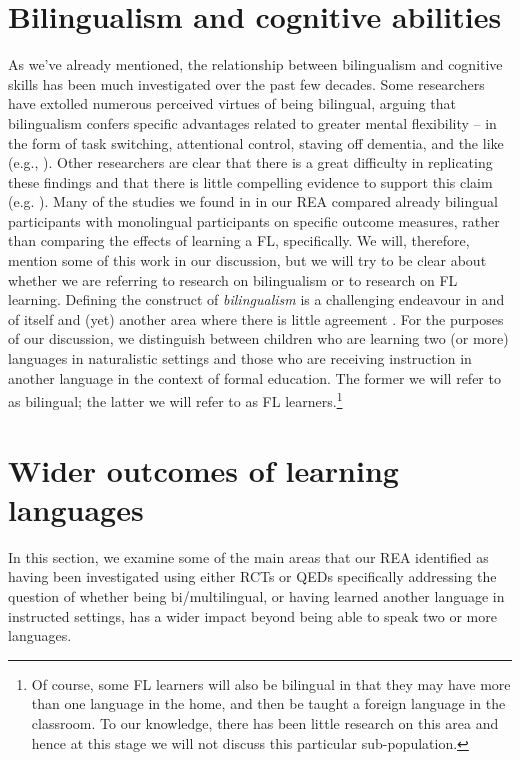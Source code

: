 \documentclass[output=paper]{langscibook}
\begin{document}
\section{Bilingualism and cognitive abilities}\label{sec:murphy:1.1}

As we’ve already mentioned, the relationship between bilingualism and cognitive skills has been much investigated over the past few decades. Some researchers have extolled numerous perceived virtues of being bilingual, arguing that bilingualism confers specific advantages related to greater mental flexibility -- in the form of task switching, attentional control, staving off dementia, and the like (e.g., \citealt{BialystokEtAl2012,Costa2020}). Other researchers are clear that there is a great difficulty in replicating these findings and that there is little compelling evidence to support this claim (e.g. \citealt{PaapGreenberg2013,WollWei2019}). Many of the studies we found in in our REA compared already bilingual participants with monolingual participants on specific outcome measures, rather than comparing the effects of learning a FL, specifically. We will, therefore, mention some of this work in our discussion, but we will try to be clear about whether we are referring to research on bilingualism or to research on FL learning. Defining the construct of \textit{bilingualism} is a challenging endeavour in and of itself and (yet) another area where there is little agreement \citep{Murphy2014}. For the purposes of our discussion, we distinguish between children who are learning two (or more) languages in naturalistic settings and those who are receiving instruction in another language in the context of formal education. The former we will refer to as bilingual; the latter we will refer to as FL learners.\footnote{Of course, some FL learners will also be bilingual in that they may have more than one language in the home, and then be taught a foreign language in the classroom. To our knowledge, there has been little research on this area and hence at this stage we will not discuss this particular sub-population.}

\section{Wider outcomes of learning languages}\label{sec:murphy:2}

In this section, we examine some of the main areas that our REA identified as having been investigated using either RCTs or QEDs specifically addressing the question of whether being bi/multilingual, or having learned another language in instructed settings, has a wider impact beyond being able to speak two or more languages. 
\end{document}
